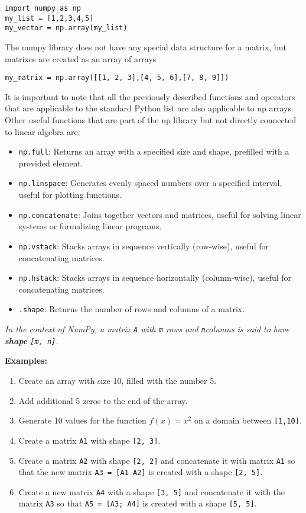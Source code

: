 \documentclass[11pt]{article}
\providecommand{\tightlist}{%
      \setlength{\itemsep}{0pt}\setlength{\parskip}{0pt}}
\begin{document}
\begin{verbatim}
import numpy as np
my_list = [1,2,3,4,5]
my_vector = np.array(my_list)
\end{verbatim}

The numpy library does not have any special data structure for a matrix,
but matrixes are created as an array of arrays

\begin{verbatim}
my_matrix = np.array([[1, 2, 3],[4, 5, 6],[7, 8, 9]])
\end{verbatim}

It is important to note that all the previously described functions and
operators that are applicable to the standard Python list are also
applicable to np arrays. Other useful functions that are part of the np
library but not directly connected to linear algebra are:

\begin{itemize}
\tightlist
\item
  \texttt{np.full}: Returns an array with a specified size and shape,
  prefilled with a provided element.
\item
  \texttt{np.linspace}: Generates evenly spaced numbers over a specified
  interval, useful for plotting functions.
\item
  \texttt{np.concatenate}: Joins together vectors and matrices, useful
  for solving linear systems or formalizing linear programs.
\item
  \texttt{np.vstack}: Stacks arrays in sequence vertically (row-wise),
  useful for concatenating matrices.
\item
  \texttt{np.hstack}: Stacks arrays in sequence horizontally
  (column-wise), useful for concatenating matrices.
\item
  \texttt{.shape}: Returns the number of rows and columns of a matrix.
\end{itemize}

\emph{In the context of NumPy, a matrix \texttt{A} with \texttt{m} rows
and \texttt{n}columns is said to have \textbf{shape}
\texttt{{[}m,\ n{]}}.}

\textbf{Examples:}

\begin{enumerate}
\def\labelenumi{\arabic{enumi}.}
\item
  Create an array with size 10, filled with the number 5.
\item
  Add additional 5 zeros to the end of the array.
\item
  Generate 10 values for the function \(f(x)=x^2\) on a domain between
  \texttt{{[}1,10{]}}.
\item
  Create a matrix \texttt{A1} with shape \texttt{{[}2,\ 3{]}}.
\item
  Create a matrix \texttt{A2} with shape \texttt{{[}2,\ 2{]}} and
  concatenate it with matrix \texttt{A1} so that the new matrix
  \texttt{A3\ =\ {[}A1\ A2{]}} is created with a shape
  \texttt{{[}2,\ 5{]}}.
\item
  Create a new matrix \texttt{A4} with a shape \texttt{{[}3,\ 5{]}} and
  concatenate it with the matrix \texttt{A3} so that
  \texttt{A5\ =\ {[}A3;\ A4{]}} is created with a shape
  \texttt{{[}5,\ 5{]}}.
\end{enumerate}
\end{document}

